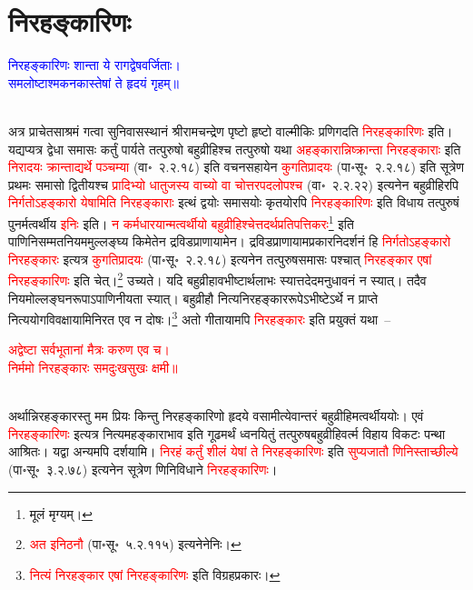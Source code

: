 \section[निरहङ्कारिणः]{निरहङ्कारिणः}
\centering\textcolor{blue}{निरहङ्कारिणः शान्ता ये रागद्वेषवर्जिताः।\nopagebreak\\
समलोष्टाश्मकनकास्तेषां ते हृदयं गृहम्॥}\nopagebreak\\
\\
\begin{sloppypar}\justifying\noindent\hspace{10mm} अत्र प्राचेतसाश्रमं गत्वा सुनिवास\-स्थानं श्रीरामचन्द्रेण पृष्टो हृष्टो वाल्मीकिः प्रणिगदति \textcolor{red}{निरहङ्कारिणः} इति। यद्यप्यत्र द्वेधा समासः कर्तुं पार्यते तत्पुरुषो बहुव्रीहिश्च तत्पुरुषो यथा \textcolor{red}{अहङ्कारान्निष्क्रान्ता निरहङ्काराः} इति \textcolor{red}{निरादयः क्रान्ताद्यर्थे पञ्चम्या} (वा॰~२.२.१८) इति वचन\-सहायेन \textcolor{red}{कु\-गति\-प्रादयः} (पा॰सू॰~२.२.१८) इति सूत्रेण प्रथमः समासो द्वितीयश्च \textcolor{red}{प्रादिभ्यो धातुजस्य वाच्यो वा चोत्तर\-पद\-लोपश्च} (वा॰~२.२.२२) इत्यनेन बहुव्रीहिरपि \textcolor{red}{निर्गतोऽहङ्कारो येषामिति निरहङ्काराः} इत्थं द्वयोः समासयोः कृतयोरपि \textcolor{red}{निरहङ्कारिणः} इति विधाय तत्पुरुषं पुनर्मत्वर्थीय \textcolor{red}{इनिः} इति। \textcolor{red}{न कर्मधारयान्मत्वर्थीयो बहुव्रीहिश्चेत्तदर्थ\-प्रतिपत्ति\-करः}\footnote{मूलं मृग्यम्।} इति पाणिनि\-सम्मत\-नियममुल्लङ्घ्य किमेतेन
द्रविड\-प्राणायामेन। द्रविड\-प्राणायाम\-प्रकार\-निदर्शनं हि \textcolor{red}{निर्गतोऽहङ्कारो निरहङ्कारः} इत्यत्र \textcolor{red}{कु\-गति\-प्रादयः} (पा॰सू॰~२.२.१८) इत्यनेन तत्पुरुष\-समासः पश्चात् \textcolor{red}{निरहङ्कार एषां निरहङ्कारिणः} इति चेत्।\footnote{\textcolor{red}{अत इनिठनौ} (पा॰सू॰~५.२.११५) इत्यनेनेनिः।} उच्यते। यदि बहुव्रीहावभीष्टार्थ\-लाभः स्यात्तदेदमनुधावनं न स्यात्। तदैव नियमोल्लङ्घन\-रूपाऽपाणिनीयता स्यात्। बहुव्रीहौ नित्य\-निरहङ्कार\-रूपेऽभीष्टेऽर्थे न प्राप्ते नित्य\-योग\-विवक्षायामिनिरत एव न दोषः।\footnote{\textcolor{red}{नित्यं निरहङ्कार एषां निरहङ्कारिणः} इति विग्रहप्रकारः।} अतो गीतायामपि \textcolor{red}{निरहङ्कारः} इति प्रयुक्तं यथा~–\end{sloppypar}
\centering\textcolor{red}{अद्वेष्टा सर्वभूतानां मैत्रः करुण एव च।\nopagebreak\\
निर्ममो निरहङ्कारः समदुःखसुखः क्षमी॥}\nopagebreak\\
\\
\begin{sloppypar}\justifying\noindent अर्थान्निरहङ्कारस्तु मम प्रियः किन्तु निरहङ्कारिणो हृदये वसामीत्येवान्तरं बहुव्रीहि\-मत्वर्थीययोः। एवं \textcolor{red}{निरहङ्कारिणः} इत्यत्र नित्यमहङ्काराभाव इति गूढमर्थं ध्वनयितुं तत्पुरुष\-बहुव्रीहि\-वर्त्म विहाय विकटः पन्था आश्रितः। यद्वा अन्यमपि दर्शयामि। \textcolor{red}{निरहं कर्तुं शीलं येषां ते निरहङ्कारिणः} इति \textcolor{red}{सुप्यजातौ णिनिस्ताच्छील्ये} (पा॰सू॰~३.२.७८) इत्यनेन सूत्रेण णिनि\-विधाने \textcolor{red}{निरहङ्कारिणः}।\end{sloppypar}

